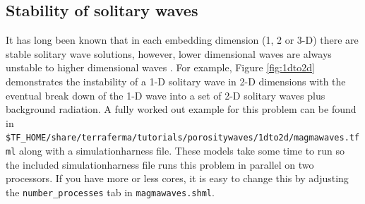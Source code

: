 \subsection{Stability of solitary waves}
\label{sec:stab-solit}


It has long been known that in each embedding dimension (1, 2 or 3-D)
there are stable solitary wave solutions, however, lower dimensional
waves are always unstable to higher dimensional waves
\cite{scott_magma_1986,barcilon_nonlinear-waves_1986,barcilon_solitary_1989}.
For example, Figure \ref{fig:1dto2d} demonstrates the instability of a
1-D solitary wave in 2-D dimensions with the eventual break down of the
1-D wave into a set of 2-D solitary waves plus background radiation.
A fully worked out example for this problem can be found in
\texttt{\$TF\_HOME/share/terraferma/tutorials/porositywaves/1dto2d/magmawaves.tfml}
along with a simulationharness file.  These models take some time to run so
the included simulationharness file runs this problem in parallel on two
processors.  If you have more or less cores, it is easy to change this
by adjusting the \texttt{number\_processes} tab in
\texttt{magmawaves.shml}.

